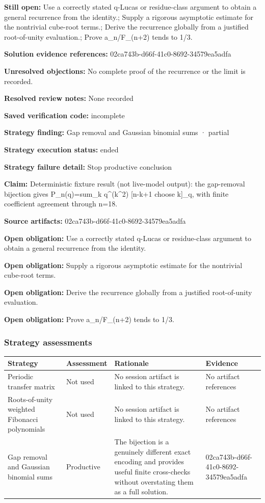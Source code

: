 \documentclass[11pt]{article}
\begin{document}
\textbf{Still open:} Use a correctly stated q-Lucas or residue-class argument to obtain a general recurrence from the identity.; Supply a rigorous asymptotic estimate for the nontrivial cube-root terms.; Derive the recurrence globally from a justified root-of-unity evaluation.; Prove a\_n/F\_(n+2) tends to 1/3.\par
\textbf{Solution evidence references:} 02ca743b-d66f-41c0-8692-34579ea5adfa\par
\textbf{Unresolved objections:} No complete proof of the recurrence or the limit is recorded.\par
\textbf{Resolved review notes:} None recorded\par
\textbf{Saved verification code:} incomplete\par
\textbf{Strategy finding:} Gap removal and Gaussian binomial sums · partial\par
\textbf{Strategy execution status:} ended\par
\textbf{Strategy failure detail:} Stop productive conclusion\par
\textbf{Claim:} Deterministic fixture result (not live-model output): the gap-removal bijection gives P\_n(q)=sum\_k q\textasciicircum{}(k\textasciicircum{}2) [n-k+1 choose k]\_q, with finite coefficient agreement through n=18.\par
\textbf{Source artifacts:} 02ca743b-d66f-41c0-8692-34579ea5adfa\par
\textbf{Open obligation:} Use a correctly stated q-Lucas or residue-class argument to obtain a general recurrence from the identity.\par
\textbf{Open obligation:} Supply a rigorous asymptotic estimate for the nontrivial cube-root terms.\par
\textbf{Open obligation:} Derive the recurrence globally from a justified root-of-unity evaluation.\par
\textbf{Open obligation:} Prove a\_n/F\_(n+2) tends to 1/3.\par
\subsubsection*{Strategy assessments}
\begin{longtable}{>{\raggedright\arraybackslash}p{.16\linewidth}>{\raggedright\arraybackslash}p{.15\linewidth}>{\raggedright\arraybackslash}p{.40\linewidth}>{\raggedright\arraybackslash}p{.17\linewidth}}
\toprule Strategy & Assessment & Rationale & Evidence \\
\midrule\endhead
Periodic transfer matrix & Not used & No session artifact is linked to this strategy. & No artifact references \\
Roots-of-unity weighted Fibonacci polynomials & Not used & No session artifact is linked to this strategy. & No artifact references \\
Gap removal and Gaussian binomial sums & Productive & The bijection is a genuinely different exact encoding and provides useful finite cross-checks without overstating them as a full solution. & 02ca743b-d66f-41c0-8692-34579ea5adfa \\
\bottomrule
\end{longtable}
\end{document}
